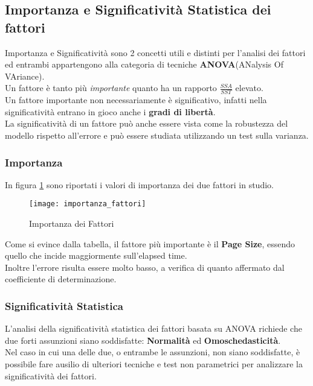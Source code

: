 \subsection{Importanza e Significatività Statistica dei fattori}
Importanza e Significatività sono 2 concetti utili e distinti per l'analisi dei
fattori ed entrambi appartengono alla categoria di tecniche
\textbf{ANOVA}(ANalysis Of VAriance).\\
Un fattore è tanto più \textit{importante} quanto ha un rapporto $\frac{SSA}{SST}$
elevato.\\
Un fattore importante non necessariamente è significativo, infatti nella significatività
entrano in gioco anche i \textbf{gradi di libertà}.\\
La significatività di un fattore può anche essere vista come la robustezza del
modello rispetto all'errore e può essere studiata utilizzando un test sulla
varianza.\\

\subsubsection{Importanza}
In figura \ref{importanza_fattori} sono riportati i valori di importanza dei due
fattori in studio.

\begin{figure}[!htbp]
  \centering
  \texttt{[image: importanza\_fattori]}
  \caption{Importanza dei Fattori}
  \label{importanza_fattori}
\end{figure}

Come si evince dalla tabella, il fattore più importante è il \textbf{Page Size},
essendo quello che incide maggiormente sull'elapsed time.\\
Inoltre l'errore risulta essere molto basso, a verifica di quanto affermato dal
coefficiente di determinazione.\\

\clearpage

\subsubsection{Significatività Statistica}
L'analisi della significatività statistica dei fattori basata su ANOVA richiede
che due forti assunzioni siano soddisfatte: \textbf{Normalità} ed
\textbf{Omoschedasticità}.\\
Nel caso in cui una delle due, o entrambe le assunzioni, non siano soddisfatte, è
possibile fare ausilio di ulteriori tecniche e test non parametrici per analizzare
la significatività dei fattori.\\

